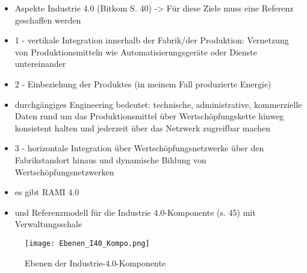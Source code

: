 \begin{itemize}
  \item Aspekte Industrie 4.0 (Bitkom S. 40) -> Für diese Ziele muss eine Referenz geschaffen werden
  \item 1 - vertikale Integration innerhalb der Fabrik/der Produktion: Vernetzung von Produktionsmitteln wie Automatisierungsgeräte oder Dienste untereinander
  \item 2 - Einbeziehung der Produktes (in meinem Fall produzierte Energie)
  \item durchgängiges Engineering bedeutet: technische, administrative, kommerzielle Daten rund um das Produktionsmittel über Wertschöpfungskette hinweg konsistent halten und jederzeit über das Netzwerk zugreifbar machen
  \item 3 - horizontale Integration über Wertschöpfungsnetzwerke über den Fabrikstandort hinaus und dynamische Bildung von Wertschöpfungsnetzwerken
  \item es gibt RAMI 4.0
  \item und Referenzmodell für die Industrie 4.0-Komponente (s. 45) mit Verwaltungsschale
\end{itemize}







\begin{figure}[h]
  \centering
  \texttt{[image: Ebenen\_I40\_Kompo.png]}
  \caption[Ebenen der Industrie-4.0-Komponente]{Ebenen der Industrie-4.0-Komponente \citep[S. 52]{BITKOM2015}}
  \label{ebenen_i40}
\end{figure}
